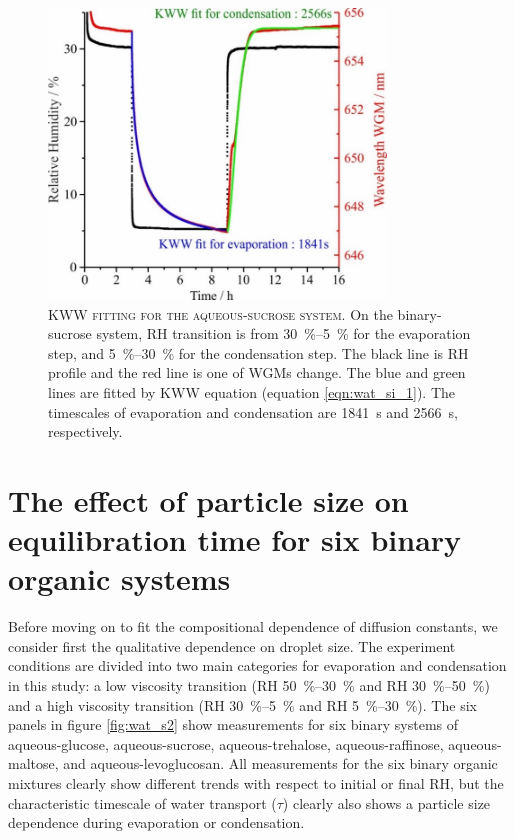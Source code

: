 \begin{figure}
    \centering
    \includegraphics[width=0.8\textwidth]{chapters/water_hopping/figures/image003.jpg}
    \caption[KWW fitting for the aqueous-sucrose system]{\textsc{KWW fitting for the aqueous-sucrose system}. On the binary-sucrose system, RH transition is from \SIrange{30}{5}{\percent} for the evaporation step, and \SIrange{5}{30}{\percent} for the condensation step. The black line is RH profile and the red line is one of WGMs change. The blue and green lines are fitted by KWW equation (equation \ref{eqn:wat_si_1}). The timescales of evaporation and condensation are \SI{1841}{\second} and \SI{2566}{\second}, respectively.}
    \label{fig:wat_s1}
\end{figure}

\section{The effect of particle size on equilibration time for six binary organic systems}
Before moving on to fit the compositional dependence of diffusion constants, we consider first the qualitative dependence on droplet size. The experiment conditions are divided into two main categories for evaporation and condensation in this study: a low viscosity transition (RH \SIrange{50}{30}{\percent} and RH \SIrange{30}{50}{\percent}) and a high viscosity transition (RH \SIrange{30}{5}{\percent} and RH \SIrange{5}{30}{\percent}). The six panels in figure \ref{fig:wat_s2} show measurements for six binary systems of aqueous-glucose, aqueous-sucrose, aqueous-trehalose, aqueous-raffinose, aqueous-maltose, and aqueous-levoglucosan. All measurements for the six binary organic mixtures clearly show different trends with respect to initial or final RH, but the characteristic timescale of water transport ($\tau$) clearly also shows a particle size dependence during evaporation or condensation.

